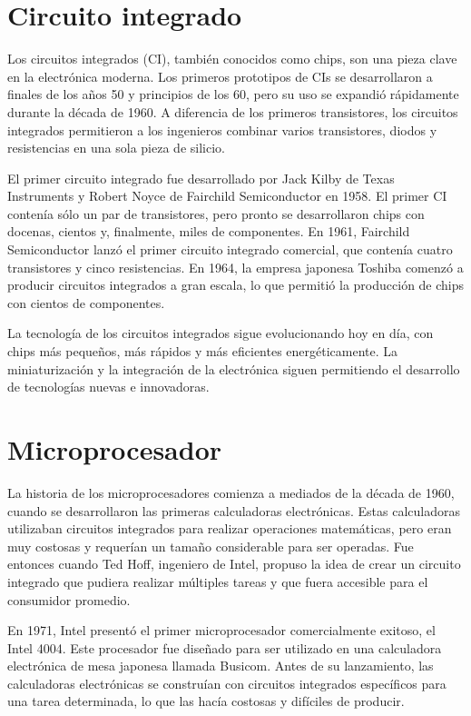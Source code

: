 \documentclass{article}
\begin{document}
\section*{Circuito integrado}

Los circuitos integrados (CI), también conocidos como chips, son una pieza clave en la electrónica moderna. 
Los primeros prototipos de CIs se desarrollaron a finales de los años 50 y principios de los 60, 
pero su uso se expandió rápidamente durante la década de 1960. A diferencia de los primeros transistores, 
los circuitos integrados permitieron a los ingenieros combinar varios transistores, diodos y resistencias 
en una sola pieza de silicio.

El primer circuito integrado fue desarrollado por Jack Kilby de Texas Instruments 
y Robert Noyce de Fairchild Semiconductor en 1958. El primer CI contenía sólo un par de transistores, 
pero pronto se desarrollaron chips con docenas, cientos y, finalmente, miles de componentes. 
En 1961, Fairchild Semiconductor lanzó el primer circuito integrado comercial, que contenía 
cuatro transistores y cinco resistencias. En 1964, la empresa japonesa Toshiba comenzó a 
producir circuitos integrados a gran escala, lo que permitió la producción de chips con 
cientos de componentes.

La tecnología de los circuitos integrados sigue evolucionando hoy en día, con chips más pequeños, más rápidos 
y más eficientes energéticamente. La miniaturización y la integración de la electrónica siguen permitiendo 
el desarrollo de tecnologías nuevas e innovadoras.

\section*{Microprocesador}
La historia de los microprocesadores comienza a mediados de la década de 1960, cuando se desarrollaron las primeras 
calculadoras electrónicas. Estas calculadoras utilizaban circuitos integrados para realizar operaciones matemáticas, 
pero eran muy costosas y requerían un tamaño considerable para ser operadas. Fue entonces cuando Ted Hoff, 
ingeniero de Intel, propuso la idea de crear un circuito integrado que pudiera realizar múltiples tareas y que fuera accesible 
para el consumidor promedio.

En 1971, Intel presentó el primer microprocesador comercialmente exitoso, el Intel 4004. Este procesador fue diseñado 
para ser utilizado en una calculadora electrónica de mesa japonesa llamada Busicom. Antes de su lanzamiento, 
las calculadoras electrónicas se construían con circuitos integrados específicos para una tarea determinada, 
lo que las hacía costosas y difíciles de producir.
\end{document}
